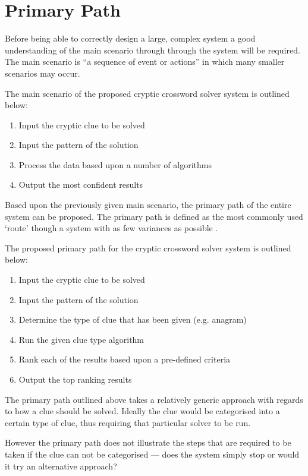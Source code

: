 \section{Primary Path}
\label{sec:primary_path}

Before being able to correctly design a large, complex system a good 
understanding of the main scenario through through the system will be required.
The main scenario is ``a sequence of event or actions'' \citep{lunn03} in which
many smaller scenarios may occur.

The main scenario of the proposed cryptic crossword solver system is outlined 
below:

\begin{enumerate}
  \item Input the cryptic clue to be solved
  \item Input the pattern of the solution
  \item Process the data based upon a number of algorithms
  \item Output the most confident results
\end{enumerate}

Based upon the previously given main scenario, the primary path of the entire 
system can be proposed. The primary path is defined as the most commonly used 
`route' though a system with as few variances as possible \citep{lunn03}.

The proposed primary path for the cryptic crossword solver system is outlined 
below:

\begin{enumerate}
  \item Input the cryptic clue to be solved
  \item Input the pattern of the solution
  \item Determine the type of clue that has been given (e.g. anagram)
  \item Run the given clue type algorithm 
  \item Rank each of the results based upon a pre-defined criteria
  \item Output the top ranking results
\end{enumerate}

The primary path outlined above takes a relatively generic approach with regards
to how a clue should be solved. Ideally the clue would be categorised into a 
certain type of clue, thus requiring that particular solver to be run.

However the primary path does not illustrate the steps that are required to be 
taken if the clue can not be categorised --- does the system simply stop or 
would it try an alternative approach?

